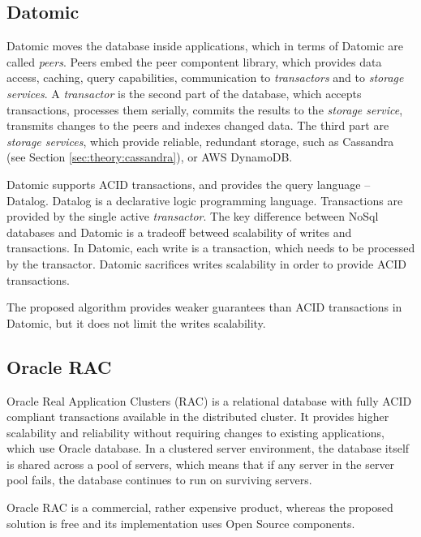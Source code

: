 \subsection{Datomic}
Datomic \cite{datomic} moves the database inside applications, which in terms of Datomic are called \emph{peers}. Peers embed the peer compontent library, which provides data access, caching, query capabilities, communication to \emph{transactors} and to \emph{storage services}. A \emph{transactor} is the second part of the database, which accepts transactions, processes them serially, commits the results to the \emph{storage service}, transmits changes to the peers and indexes changed data. The third part are \emph{storage services}, which provide reliable, redundant storage, such as Cassandra (see Section \ref{sec:theory:cassandra}), or AWS DynamoDB.

Datomic supports ACID transactions, and provides the query language -- Datalog. Datalog is a declarative logic programming language. Transactions are provided by the single active \emph{transactor}. The key difference between NoSql databases and Datomic is a tradeoff betweed scalability of writes and transactions. In Datomic, each write is a transaction, which needs to be processed by the transactor. Datomic sacrifices writes scalability in order to provide ACID transactions.

The proposed algorithm provides weaker guarantees than ACID transactions in Datomic, but it does not limit the writes scalability. 


\subsection{Oracle RAC}
Oracle Real Application Clusters (RAC) is a relational database with fully ACID compliant transactions available in the distributed cluster. 
It provides higher scalability and reliability without requiring changes to existing applications, which use Oracle database.
In a clustered server environment, the database
itself is shared across a pool of servers, which means that if any server in the server pool fails,
the database continues to run on surviving servers.

 Oracle RAC is a commercial, rather expensive product, whereas the proposed solution is free and its implementation uses Open Source components.

